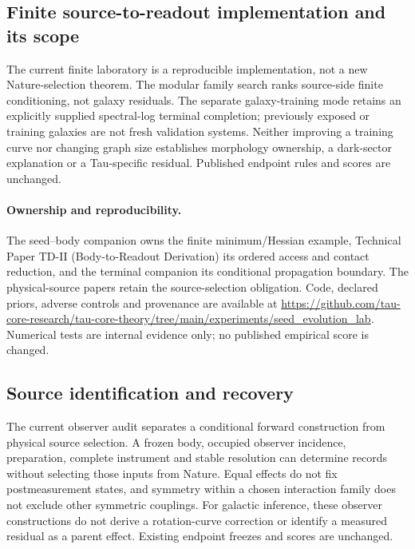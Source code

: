\documentclass[11pt]{article}
\begin{document}
\subsection{Finite source-to-readout implementation and its scope}
The current finite laboratory is a reproducible implementation, not a new Nature-selection theorem. The modular family search ranks source-side finite conditioning, not galaxy residuals. The separate galaxy-training mode retains an explicitly supplied spectral-log terminal completion; previously exposed or training galaxies are not fresh validation systems. Neither improving a training curve nor changing graph size establishes morphology ownership, a dark-sector explanation or a Tau-specific residual. Published endpoint rules and scores are unchanged.
\paragraph{Ownership and reproducibility.}
The seed--body companion owns the finite minimum/Hessian example, Technical Paper TD-II (Body-to-Readout Derivation) its ordered access and contact reduction, and the terminal companion its conditional propagation boundary. The physical-source papers retain the source-selection obligation. Code, declared priors, adverse controls and provenance are available at \url{https://github.com/tau-core-research/tau-core-theory/tree/main/experiments/seed_evolution_lab}. Numerical tests are internal evidence only; no published empirical score is changed.

\subsection{Source identification and recovery}
The current observer audit separates a conditional forward construction from physical source selection. A frozen body, occupied observer incidence, preparation, complete instrument and stable resolution can determine records without selecting those inputs from Nature. Equal effects do not fix postmeasurement states, and symmetry within a chosen interaction family does not exclude other symmetric couplings. For galactic inference, these observer constructions do not derive a rotation-curve correction or identify a measured residual as a parent effect. Existing endpoint freezes and scores are unchanged.
\end{document}

